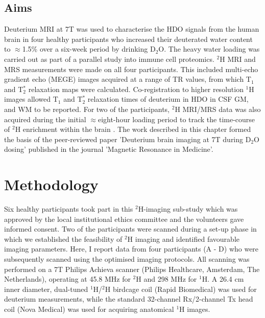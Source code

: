\documentclass[class=article, crop=false]{standalone}
\begin{document}
\subsection{Aims}

Deuterium MRI at 7T was used to characterise the HDO signals from the human brain in four healthy participants who increased their deuterated water content to $\approx$1.5\% over a six-week period by drinking D$_2$O. The heavy water loading was carried out as part of a parallel study into immune cell proteomics. $^2$H MRI and MRS measurements were made on all four participants. This included multi-echo gradient echo (MEGE) images acquired at a range of TR values, from which T$_1$ and T$_2^*$ relaxation maps were calculated. Co-registration to higher resolution $^1$H images allowed T$_1$ and T$_2^*$ relaxation times of deuterium in HDO in CSF GM, and WM to be reported. For two of the participants, $^2$H MRI/MRS data was also acquired during the initial $\approx$eight-hour loading period to track the time-course of $^2$H enrichment within the brain \cite{Cocking2023DeuteriumDosing}. The work described in this chapter formed the basis of the peer-reviewed paper 'Deuterium brain imaging at 7T during D$_2$O dosing' published in the journal 'Magnetic Resonance in Medicine'.


\section{Methodology}

Six healthy participants took part in this $^2$H-imaging sub-study which was approved by the local institutional ethics committee and the volunteers gave informed consent. Two of the participants were scanned during a set-up phase in which we established the feasibility of $^2$H imaging and identified favourable imaging parameters. Here, I report data from four participants (A - D) who were subsequently scanned using the optimised imaging protocols. All scanning was performed on a 7T Philips Achieva scanner (Philips Healthcare, Amsterdam, The Netherlands), operating at 45.8 MHz for $^2$H and 298 MHz for $^1$H. A 26.4 cm inner diameter, dual-tuned $^1$H/$^2$H birdcage coil (Rapid Biomedical) was used for deuterium measurements, while the standard 32-channel Rx/2-channel Tx head coil (Nova Medical) was used for acquiring anatomical $^1$H images.  
\end{document}
